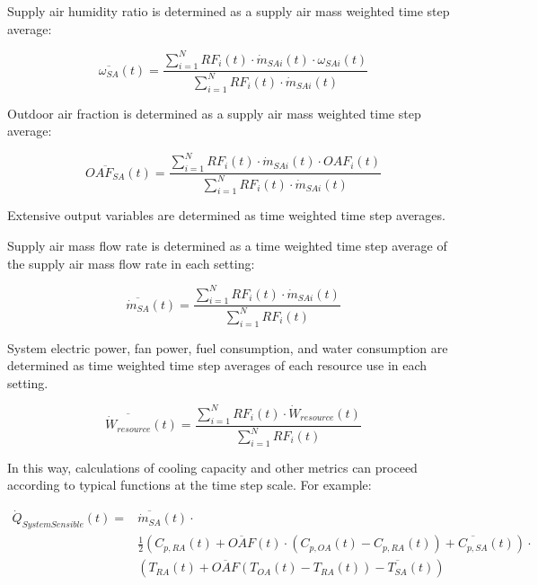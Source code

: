 Supply air humidity ratio is determined as a supply air mass weighted time step average:

\begin{equation}
	\overline{\omega_{SA}}(t) = \frac{\sum_{i=1}^{N}RF_{i}(t) \cdot \dot{m}_{SAi}(t) \cdot \omega_{SAi}(t)} {\sum_{i=1}^{N}RF_{i}(t) \cdot \dot{m}_{SAi}(t)}
\end{equation}

Outdoor air fraction is determined as a supply air mass weighted time step average:

\begin{equation}
	\overline{OAF_{SA}}(t) = \frac{\sum_{i=1}^{N}RF_{i}(t) \cdot \dot{m}_{SAi}(t) \cdot OAF_{i}(t)} {\sum_{i=1}^{N}RF_{i}(t) \cdot \dot{m}_{SAi}(t)}
\end{equation}

Extensive output variables are determined as time weighted time step averages.

Supply air mass flow rate is determined as a time weighted time step average of the supply air mass flow rate in each setting:

\begin{equation}
	\overline{\dot{m}_{SA}}(t) = \frac{\sum_{i=1}^{N}RF_{i}(t) \cdot \dot{m}_{SAi}(t)} {\sum_{i=1}^{N}RF_{i}(t)}
\end{equation}

System electric power, fan power, fuel consumption, and water consumption are determined as time weighted time step averages of each resource use in each setting.

\begin{equation}
	\overline{\dot{W}_{resource}}(t) = \frac{\sum_{i=1}^{N}RF_{i}(t) \cdot \dot{W}_{resource}(t)} {\sum_{i=1}^{N}RF_{i}(t)}
\end{equation}

In this way, calculations of cooling capacity and other metrics can proceed according to typical functions at the time step scale. For example:

\begin{align}
	\dot{Q}_{SystemSensible}(t) = & \overline{\dot{m}_{SA}}(t) \cdot \nonumber \\
	                              & \frac{1}{2}\left(C_{p,RA}(t) + \overline{OAF}(t) \cdot \left( C_{p,OA}(t)-C_{p,RA}(t) \right) + \overline{C_{p,SA}}(t) \right) \cdot \nonumber \\
	                              & \left( T_{RA}(t) + \overline{OAF}\left( T_{OA}(t) - T_{RA}(t) \right) - \overline{T_{SA}}(t) \right)
\end{align}


